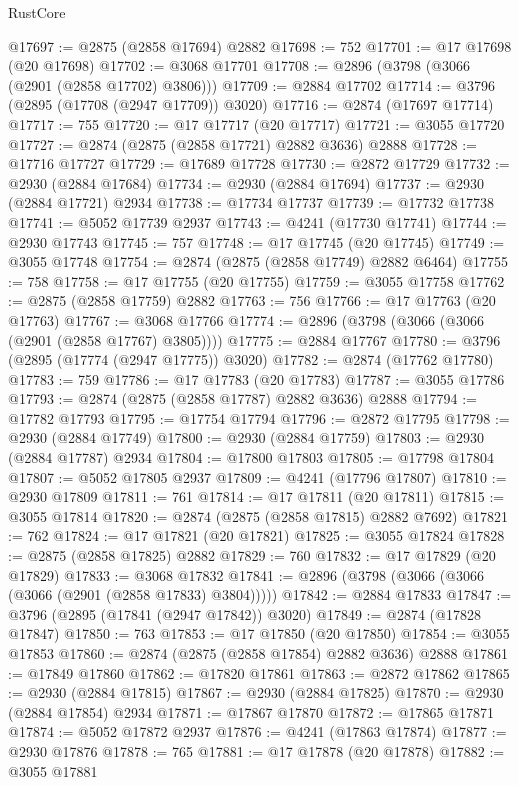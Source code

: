 \begin{lexlean}{RustCore}
\begin{coremodule}
@17697 := @2875 (@2858 @17694) @2882
@17698 := 752
@17701 := @17 @17698 (@20 @17698)
@17702 := @3068 @17701
@17708 := @2896 (@3798 (@3066 (@2901 (@2858 @17702) @3806)))
@17709 := @2884 @17702
@17714 := @3796 (@2895 (@17708 (@2947 @17709)) @3020)
@17716 := @2874 (@17697 @17714)
@17717 := 755
@17720 := @17 @17717 (@20 @17717)
@17721 := @3055 @17720
@17727 := @2874 (@2875 (@2858 @17721) @2882 @3636) @2888
@17728 := @17716 @17727
@17729 := @17689 @17728
@17730 := @2872 @17729
@17732 := @2930 (@2884 @17684)
@17734 := @2930 (@2884 @17694)
@17737 := @2930 (@2884 @17721) @2934
@17738 := @17734 @17737
@17739 := @17732 @17738
@17741 := @5052 @17739 @2937
@17743 := @4241 (@17730 @17741)
@17744 := @2930 @17743
@17745 := 757
@17748 := @17 @17745 (@20 @17745)
@17749 := @3055 @17748
@17754 := @2874 (@2875 (@2858 @17749) @2882 @6464)
@17755 := 758
@17758 := @17 @17755 (@20 @17755)
@17759 := @3055 @17758
@17762 := @2875 (@2858 @17759) @2882
@17763 := 756
@17766 := @17 @17763 (@20 @17763)
@17767 := @3068 @17766
@17774 := @2896 (@3798 (@3066 (@3066 (@2901 (@2858 @17767) @3805))))
@17775 := @2884 @17767
@17780 := @3796 (@2895 (@17774 (@2947 @17775)) @3020)
@17782 := @2874 (@17762 @17780)
@17783 := 759
@17786 := @17 @17783 (@20 @17783)
@17787 := @3055 @17786
@17793 := @2874 (@2875 (@2858 @17787) @2882 @3636) @2888
@17794 := @17782 @17793
@17795 := @17754 @17794
@17796 := @2872 @17795
@17798 := @2930 (@2884 @17749)
@17800 := @2930 (@2884 @17759)
@17803 := @2930 (@2884 @17787) @2934
@17804 := @17800 @17803
@17805 := @17798 @17804
@17807 := @5052 @17805 @2937
@17809 := @4241 (@17796 @17807)
@17810 := @2930 @17809
@17811 := 761
@17814 := @17 @17811 (@20 @17811)
@17815 := @3055 @17814
@17820 := @2874 (@2875 (@2858 @17815) @2882 @7692)
@17821 := 762
@17824 := @17 @17821 (@20 @17821)
@17825 := @3055 @17824
@17828 := @2875 (@2858 @17825) @2882
@17829 := 760
@17832 := @17 @17829 (@20 @17829)
@17833 := @3068 @17832
@17841 := @2896 (@3798 (@3066 (@3066 (@3066 (@2901 (@2858 @17833) @3804)))))
@17842 := @2884 @17833
@17847 := @3796 (@2895 (@17841 (@2947 @17842)) @3020)
@17849 := @2874 (@17828 @17847)
@17850 := 763
@17853 := @17 @17850 (@20 @17850)
@17854 := @3055 @17853
@17860 := @2874 (@2875 (@2858 @17854) @2882 @3636) @2888
@17861 := @17849 @17860
@17862 := @17820 @17861
@17863 := @2872 @17862
@17865 := @2930 (@2884 @17815)
@17867 := @2930 (@2884 @17825)
@17870 := @2930 (@2884 @17854) @2934
@17871 := @17867 @17870
@17872 := @17865 @17871
@17874 := @5052 @17872 @2937
@17876 := @4241 (@17863 @17874)
@17877 := @2930 @17876
@17878 := 765
@17881 := @17 @17878 (@20 @17878)
@17882 := @3055 @17881

\end{coremodule}
\end{lexlean}

